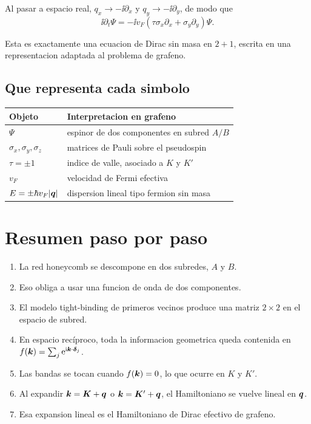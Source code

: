 Al pasar a espacio real, \(q_x\to -\ii\partial_x\) y \(q_y\to -\ii\partial_y\), de modo que
\begin{equation}
\ii \partial_t \Psi
=
-\ii v_F(\tau \sigma_x \partial_x + \sigma_y \partial_y)\Psi.
\label{c02:eq:dirac-real-space}
\end{equation}

Esta es exactamente una ecuacion de Dirac sin masa en \(2+1\), escrita en una representacion adaptada al problema de grafeno.

\subsection{Que representa cada simbolo}

\begin{center}
\begin{tabular}{p{}p{}}
\toprule
\textbf{Objeto} & \textbf{Interpretacion en grafeno} \\
\midrule
\(\Psi\) & espinor de dos componentes en subred \(A/B\) \\
\(\sigma_x,\sigma_y,\sigma_z\) & matrices de Pauli sobre el pseudospin \\
\(\tau=\pm 1\) & indice de valle, asociado a \(K\) y \(K'\) \\
\(v_F\) & velocidad de Fermi efectiva \\
\(E=\pm \hbar v_F |\bm{q}|\) & dispersion lineal tipo fermion sin masa \\
\bottomrule
\end{tabular}
\end{center}

\section{Resumen paso por paso}

\begin{enumerate}[leftmargin=*]
  \item La red honeycomb se descompone en dos subredes, \(A\) y \(B\).
  \item Eso obliga a usar una funcion de onda de dos componentes.
  \item El modelo tight-binding de primeros vecinos produce una matriz \(2\times 2\) en el espacio de subred.
  \item En espacio recíproco, toda la informacion geometrica queda contenida en \(f(\bm{k})=\sum_j \mathrm{e}^{\mathrm{i} \bm{k}\cdot\bm{\delta}_j}\).
  \item Las bandas se tocan cuando \(f(\bm{k})=0\), lo que ocurre en \(K\) y \(K'\).
  \item Al expandir \(\bm{k}=\bm{K}+\bm{q}\) o \(\bm{k}=\bm{K}'+\bm{q}\), el Hamiltoniano se vuelve lineal en \(\bm{q}\).
  \item Esa expansion lineal es el Hamiltoniano de Dirac efectivo de grafeno.
\end{enumerate}


